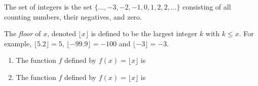 \documentclass{ximera}
\author{Kenneth Berglund}
\begin{document}
\begin{exercise}
The set of integers is the set $\{\ldots, -3, -2, -1, 0, 1, 2, 2, \ldots\}$ consisting of all counting numbers, their negatives, and zero. 

The \emph{floor} of $x$, denoted $\lfloor x \rfloor$ is defined to be the largest integer $k$ with $k \le x$. For example, $\lfloor 5.2 \rfloor = 5$, $\lfloor -99.9 \rfloor = -100$ and $\lfloor -3 \rfloor = -3$.
\begin{enumerate}
\item The function $f$ defined by $f(x) = \lfloor x \rfloor$ is 
\begin{multipleChoice}
\end{multipleChoice}

\item The function $f$ defined by $f(x) = \lfloor x \rfloor$ is 
\begin{multipleChoice}
\end{multipleChoice}
\end{enumerate}
\end{exercise}
\end{document}
